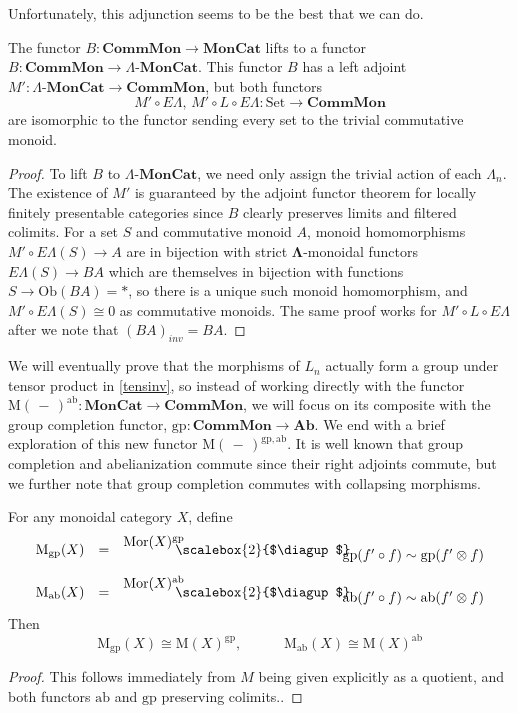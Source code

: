 \documentclass{amsbook} %
\newcommand{\mb}{\mathbf}
\newcommand{\Set}{\ensuremath{\textrm{Set}}}
\newcommand{\ML}{\mathbf{\Lambda}}
\newcommand{\bigquotient}[2]{ \raisebox{0.75\height}{$#1$} \mkern-12mu\scalebox{2}{$\diagup$}\mkern-10mu \raisebox{-0.5\height}{$#2$} }
\newcommand{\EL}{E\Lambda}
\newcommand{\ob}{\textrm{Ob}}
\newcommand{\lmc}{\Lambda\mbox{-}\mb{MonCat}}
\newcommand{\sets}{\Set}
\newcommand{\cmon}{\ensuremath{\mb{CommMon}}}
\newcommand{\moncat}{\ensuremath{\mb{MonCat}}}
\numberwithin{section}{chapter}
\begin{document}
Unfortunately, this adjunction seems to be the best that we can do. 
\begin{prop}
The functor $B:\cmon \to \moncat$ lifts to a functor $B:\cmon \to \lmc$. This functor $B$ has a left adjoint $M':\lmc \to \cmon$, but both functors
\[
M' \circ \EL, \, M' \circ L \circ \EL : \sets \to \cmon
\]
are isomorphic to the functor sending every set to the trivial commutative monoid.
\end{prop}
\begin{proof}
To lift $B$ to $\lmc$, we need only assign the trivial action of each $\Lambda_n$. The existence of $M'$ is guaranteed by the adjoint functor theorem for locally finitely presentable categories since $B$ clearly preserves limits and filtered colimits.  For a set $S$ and commutative monoid $A$, monoid homomorphisms $M' \circ \EL(S) \to A$ are in bijection with strict $\ML$-monoidal functors $\EL(S) \to BA$ which are themselves in bijection with functions $S \to \ob(BA) = *$, so there is a unique such monoid homomorphism, and $M' \circ \EL(S) \cong 0$ as commutative monoids. The same proof works for $M' \circ L \circ \EL$ after we note that $(BA)_{inv} = BA$.
\end{proof}





 We will eventually prove that the morphisms of $L_n$ actually form a group under tensor product in \cref{tensinv}, so instead of working directly with the functor $\mathrm{M}(\, - \,)^{\mathrm{ab}}: \moncat \to \cmon$, we will focus on its composite with the group completion functor, $\mathrm{gp} : \cmon \to \mb{Ab}$. We end with a brief exploration of this new functor $\mathrm{M}(\, - \,)^{\mathrm{gp},\mathrm{ab}}$.  
It is well known that group completion and abelianization commute since their right adjoints commute, but we further note that group completion commutes with collapsing morphisms.


\begin{lem}\label{Morder} For any monoidal category $X$, define
\[ \begin{array}{rll} 
			\mathrm{M}_{\mathrm{gp}}(X) & = & \bigquotient{\mathrm{Mor}(X)^{\mathrm{gp}}}{\mathrm{gp}(f' \circ f) \sim \mathrm{gp}(f' \otimes f)} \\[\bigskipamount]
			\mathrm{M}_{\mathrm{ab}}(X) & = & \bigquotient{\mathrm{Mor}(X)^{\mathrm{ab}}}{\mathrm{ab}(f' \circ f) \sim \mathrm{ab}(f' \otimes f)}
		\end{array}
\] 
Then
\[ \mathrm{M}_{\mathrm{gp}}(X) \cong \mathrm{M}(X)^{\mathrm{gp}}, \quad \quad \quad \mathrm{M}_{\mathrm{ab}}(X) \cong \mathrm{M}(X)^{\mathrm{ab}} \]
\end{lem}
\begin{proof}
This follows immediately from $M$ being given explicitly as a quotient, and both functors $\mathrm{ab}$ and $\mathrm{gp}$ preserving colimits..
\end{proof}
\end{document}

